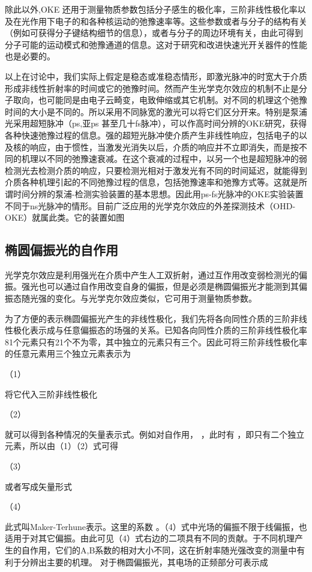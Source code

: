 除此以外,OKE 还用于测量物质参数包括分子感生的极化率，三阶非线性极化率以及在光作用下电子的和各种核运动的弛豫速率等。这些参数或者与分子的结构有关（例如可获得分子键结构细节的信息），或者与分子的周边环境有关，由此可得到分子可能的运动模式和弛豫通道的信息。这对于研究和改进快速光开关器件的性能也是必要的。

以上在讨论中，我们实际上假定是稳态或准稳态情形，即激光脉冲的时宽大于介质形成非线性折射率的时间或它的弛豫时间。然而产生光学克尔效应的机制不止是分子取向，也可能同是由电子云畸变，电致伸缩或其它机制。对不同的机理这个弛豫时间的大小是不同的。所以采用不同脉宽的激光可以将它们区分开来。特别是泵浦光采用超短脉冲（ps,亚ps 甚至几十fs脉冲），可以作高时间分辨的OKE研究，获得各种快速弛豫过程的信息。强的超短光脉冲使介质产生非线性响应，包括电子的以及核的响应，由于惯性，当激发光消失以后，介质的响应并不立即消失，而是按不同的机理以不同的弛豫速衰减。在这个衰减的过程中，以另一个也是超短脉冲的弱检测光去检测介质的响应，只要检测光相对于激发光有不同的时间延迟，就能得到介质各种机理引起的不同弛豫过程的信息，包括弛豫速率和弛豫方式等。这就是所谓时间分辨的泵浦-检测实验装置的基本思想。因此用ps-fs光脉冲的OKE实验装置不同于ns光脉冲的情形。目前广泛应用的光学克尔效应的外差探测技术（OHD-OKE）就属此类。它的装置如图
           
\subsection{椭圆偏振光的自作用}
光学克尔效应是利用强光在介质中产生人工双折射，通过互作用改变弱检测光的偏振。强光也可以通过自作用改变自身的偏振，但是必须是椭圆偏振光才能测到其偏振态随光强的变化。与光学克尔效应类似，它可用于测量物质参数。

为了方便的表示椭圆偏振光产生的非线性极化，我们先将各向同性介质的三阶非线性极化表示成与任意偏振态的场强的关系。已知各向同性介质的三阶非线性极化率81个元素只有21个不为零，其中独立的元素只有三个。因此可将三阶非线性极化率的任意元素用三个独立元素表示为
                          
（1）

将它代入三阶非线性极化

    （2）

就可以得到各种情况的矢量表示式。例如对自作用， ，此时有 ，即只有二个独立元素，所以由（1）（2）式可得

            （3）

或者写成矢量形式

                  （4）

此式叫Maker-Terhune表示。这里的系数 。（4）式中光场的偏振不限于线偏振，也适用于对其它偏振。由此可见（4）式右边的二项具有不同的贡献。于不同机理产生的自作用，它们的A,B系数的相对大小不同，这在折射率随光强改变的测量中有利于分辨出主要的机理。
对于椭圆偏振光，其电场的正频部分可表示成

